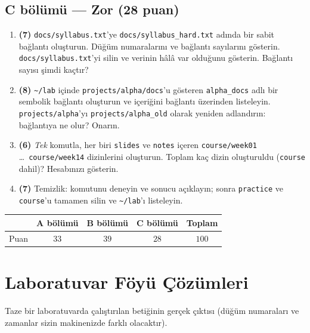 \subsection*{C bölümü --- Zor (28 puan)}
\begin{enumerate}[leftmargin=2.2em,label=\textbf{\arabic*.},start=14]
  \item \textbf{(7)} \texttt{docs/syllabus.txt}'ye \texttt{docs/syllabus\_hard.txt} adında bir sabit bağlantı oluşturun. Düğüm numaralarını ve bağlantı sayılarını gösterin. \texttt{docs/syllabus.txt}'yi silin ve verinin hâlâ var olduğunu gösterin. Bağlantı sayısı şimdi kaçtır?
  \item \textbf{(8)} \texttt{\textasciitilde/lab} içinde \texttt{projects/alpha/docs}'u gösteren \texttt{alpha\_docs} adlı bir sembolik bağlantı oluşturun ve içeriğini bağlantı üzerinden listeleyin. \texttt{projects/alpha}'yı \texttt{projects/alpha\_old} olarak yeniden adlandırın: bağlantıya ne olur? Onarın.
  \item \textbf{(6)} \emph{Tek} komutla, her biri \texttt{slides} ve \texttt{notes} içeren \texttt{course/week01} \dots\ \texttt{course/week14} dizinlerini oluşturun. Toplam kaç dizin oluşturuldu (\texttt{course} dahil)? Hesabınızı gösterin.
  \item \textbf{(7)} Temizlik:  komutunu deneyin ve sonucu açıklayın; sonra \texttt{practice} ve \texttt{course}'u tamamen silin ve \texttt{\textasciitilde/lab}'ı listeleyin.
\end{enumerate}

\begin{center}
\renewcommand{\arraystretch}{1.15}
\begin{tabular}{@{}lccc|c@{}}
\toprule
 & \textbf{A bölümü} & \textbf{B bölümü} & \textbf{C bölümü} & \textbf{Toplam} \\
\midrule
Puan & $33$ & $39$ & $28$ & $100$ \\
\bottomrule
\end{tabular}
\end{center}

\section{Laboratuvar Föyü Çözümleri}

Taze bir laboratuvarda çalıştırılan  betiğinin gerçek çıktısı (düğüm numaraları ve zamanlar sizin makinenizde farklı olacaktır).

